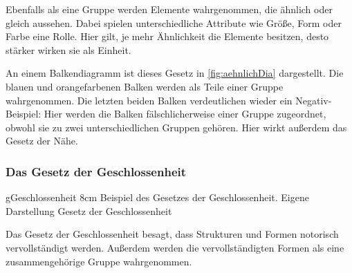 Ebenfalls als eine Gruppe werden Elemente wahrgenommen, die ähnlich oder gleich aussehen.
Dabei spielen unterschiedliche Attribute wie Größe, Form oder Farbe eine Rolle.
Hier gilt, je mehr Ähnlichkeit die Elemente besitzen, desto stärker wirken sie als Einheit.

An einem Balkendiagramm ist dieses Gesetz in \ref{fig:aehnlichDia} dargestellt.
Die blauen und orangefarbenen Balken werden als Teile einer Gruppe wahrgenommen.
Die letzten beiden Balken verdeutlichen wieder ein Negativ-Beispiel: Hier werden die Balken fälschlicherweise einer Gruppe zugeordnet, obwohl sie zu zwei unterschiedlichen Gruppen gehören.
Hier wirkt außerdem das Gesetz der Nähe.


\subsubsection{Das Gesetz der Geschlossenheit}
\bild
{gGeschlossenheit}
{8cm}
{Beispiel des Gesetzes der Geschlossenheit. Eigene Darstellung}
{Gesetz der Geschlossenheit}

Das Gesetz der Geschlossenheit besagt, dass Strukturen und Formen notorisch vervollständigt werden.
Außerdem werden die vervollständigten Formen als eine zusammengehörige Gruppe wahrgenommen.

